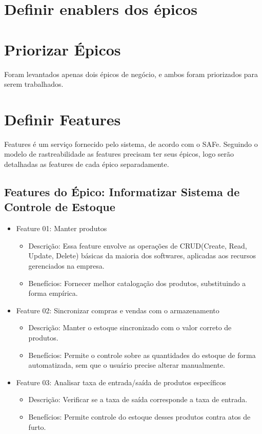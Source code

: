 \section{Definir enablers dos épicos}

\section{Priorizar Épicos}
Foram levantados apenas dois épicos de negócio, e ambos foram priorizados para serem trabalhados.

\section{Definir Features}
Features é um serviço fornecido pelo sistema, de acordo com o SAFe. Seguindo o modelo de rastreabilidade as features precisam ter seus épicos, logo serão detalhadas as features de cada épico separadamente.

\subsection{Features do Épico: Informatizar Sistema de Controle de Estoque}

\begin{itemize}
\item Feature 01: Manter produtos
\begin{itemize}
\item Descrição: Essa feature envolve as operações de CRUD(Create, Read, Update, Delete) básicas da maioria dos softwares, aplicadas aos recursos gerenciados na empresa.
\item Benefícios: Fornecer melhor catalogação dos produtos, substituindo a forma empírica.
\end{itemize}

\item Feature 02: Sincronizar compras e vendas com o armazenamento
\begin{itemize}
    \item Descrição: Manter o estoque sincronizado com o valor correto de produtos.
    \item Benefícios: Permite o controle sobre as quantidades do estoque de forma automatizada, sem que o usuário precise alterar manualmente.
\end{itemize}


\item Feature 03: Analisar taxa de entrada/saída de produtos específicos
\begin{itemize}
	\item Descrição: Verificar se a taxa de saída corresponde a taxa de entrada.
	\item Benefícios: Permite controle do estoque desses produtos contra atos de furto.
\end{itemize}

\end{itemize}

